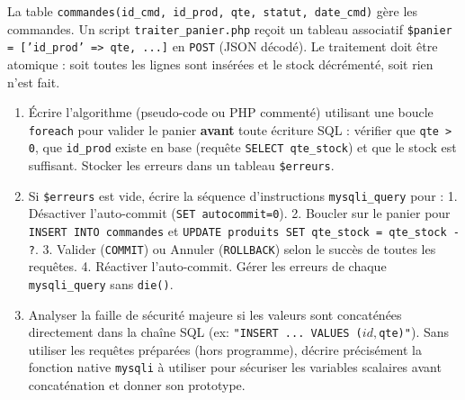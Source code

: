 \documentclass[11pt]{article}
\begin{document}
\begin{exercice}
La table \texttt{commandes(id\_cmd, id\_prod, qte, statut, date\_cmd)} gère les commandes. Un script \texttt{traiter\_panier.php} reçoit un tableau associatif \texttt{\$panier = ['id\_prod' => qte, ...]} en \texttt{POST} (JSON décodé). Le traitement doit être atomique : soit toutes les lignes sont insérées et le stock décrémenté, soit rien n'est fait.

\begin{enumerate}
    \item Écrire l'algorithme (pseudo-code ou PHP commenté) utilisant une boucle \texttt{foreach} pour valider le panier \textbf{avant} toute écriture SQL : vérifier que \texttt{qte > 0}, que \texttt{id\_prod} existe en base (requête \texttt{SELECT qte\_stock}) et que le stock est suffisant. Stocker les erreurs dans un tableau \texttt{\$erreurs}.
    \item Si \texttt{\$erreurs} est vide, écrire la séquence d'instructions \texttt{mysqli\_query} pour : 1. Désactiver l'auto-commit (\texttt{SET autocommit=0}). 2. Boucler sur le panier pour \texttt{INSERT INTO commandes} et \texttt{UPDATE produits SET qte\_stock = qte\_stock - ?}. 3. Valider (\texttt{COMMIT}) ou Annuler (\texttt{ROLLBACK}) selon le succès de toutes les requêtes. 4. Réactiver l'auto-commit. Gérer les erreurs de chaque \texttt{mysqli\_query} sans \texttt{die()}.
    \item Analyser la faille de sécurité majeure si les valeurs sont concaténées directement dans la chaîne SQL (ex: \texttt{"INSERT ... VALUES ($id, $qte)"}). Sans utiliser les requêtes préparées (hors programme), décrire précisément la fonction native \texttt{mysqli} à utiliser pour sécuriser les variables scalaires avant concaténation et donner son prototype.
\end{enumerate}
\end{exercice}
\end{document}
